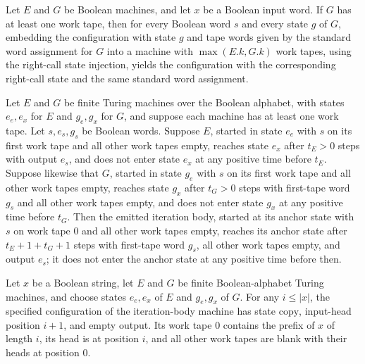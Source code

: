 \begin{theorem}
\label{Turing.embed_ofWords_right}
\leanok
{}
Let $E$ and $G$ be Boolean machines, and let $x$ be a Boolean input word. If $G$ has at
least one work tape, then for every Boolean word $s$ and every state $g$ of $G$,
embedding the configuration with state $g$ and tape words given by the standard word
assignment for $G$ into a machine with $\max(E.k,G.k)$ work tapes, using the right-call
state injection, yields the configuration with the corresponding right-call state and
the same standard word assignment.
\end{theorem}

\begin{theorem}
\label{Turing.body_round}
\leanok
{}
Let $E$ and $G$ be finite Turing machines over the Boolean alphabet, with states
$e_e,e_x$ for $E$ and $g_e,g_x$ for $G$, and suppose each machine has at least one work
tape. Let $s,e_s,g_s$ be Boolean words. Suppose $E$, started in state $e_e$ with $s$ on
its first work tape and all other work tapes empty, reaches state $e_x$ after $t_E>0$
steps with output $e_s$, and does not enter state $e_x$ at any positive time before
$t_E$. Suppose likewise that $G$, started in state $g_e$ with $s$ on its first work tape
and all other work tapes empty, reaches state $g_x$ after $t_G>0$ steps with first-tape
word $g_s$ and all other work tapes empty, and does not enter state $g_x$ at any
positive time before $t_G$. Then the emitted iteration body, started at its anchor state
with $s$ on work tape $0$ and all other work tapes empty, reaches its
anchor state after $t_E+1+t_G+1$ steps with first-tape word $g_s$, all other work tapes
empty, and output $e_s$; it does not enter the anchor state at any positive time before
then.
\end{theorem}

\begin{definition}
\label{Turing.copyCfg}
\leanok
{}
Let $x$ be a Boolean string, let $E$ and $G$ be finite Boolean-alphabet Turing machines,
and choose states $e_e,e_x$ of $E$ and $g_e,g_x$ of $G$. For any $i\le |x|$, the
specified configuration of the iteration-body machine has state $\mathrm{copy}$, input-head
position $i+1$, and empty output. Its work tape $0$ contains the prefix of $x$ of length
$i$, its head is at position $i$, and all other work tapes are blank with their heads at
position $0$.
\end{definition}

